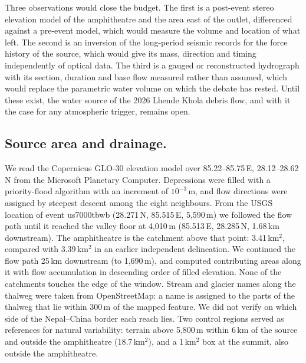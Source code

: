 \documentclass{nature}
\begin{document}
Three observations would close the budget. The first is a post-event stereo elevation model of the amphitheatre and the area east of the outlet, differenced against a pre-event model, which would measure the volume and location of what left. The second is an inversion of the long-period seismic records for the force history of the source\cite{ekstrom2013}, which would give its mass, direction and timing independently of optical data. The third is a gauged or reconstructed hydrograph with its section, duration and base flow measured rather than assumed, which would replace the parametric water volume on which the debate has rested. Until these exist, the water source of the 2026 Lhende Khola debris flow, and with it the case for any atmospheric trigger, remains open.

\begin{methods}

\subsection{Source area and drainage.}
We read the Copernicus GLO-30 elevation model\cite{copdem2021} over 85.22--85.75\textdegree\,E, 28.12--28.62\textdegree\,N from the Microsoft Planetary Computer. Depressions were filled with a priority-flood algorithm with an increment of $10^{-3}$\,m\cite{barnes2014}, and flow directions were assigned by steepest descent among the eight neighbours. From the USGS location of event us7000tbwb (28.271\textdegree\,N, 85.515\textdegree\,E, 5,590\,m) we followed the flow path until it reached the valley floor at 4,010\,m (85.513\textdegree\,E, 28.285\textdegree\,N, 1.68\,km downstream). The amphitheatre is the catchment above that point: 3.41\,km$^{2}$, compared with 3.39\,km$^{2}$ in an earlier independent delineation. We continued the flow path 25\,km downstream (to 1,690\,m), and computed contributing areas along it with flow accumulation in descending order of filled elevation. None of the catchments touches the edge of the window. Stream and glacier names along the thalweg were taken from OpenStreetMap\cite{osm2026}: a name is assigned to the parts of the thalweg that lie within 300\,m of the mapped feature. We did not verify on which side of the Nepal--China border each reach lies. Two control regions served as references for natural variability: terrain above 5,800\,m within 6\,km of the source and outside the amphitheatre (18.7\,km$^{2}$), and a 1\,km$^{2}$ box at the summit, also outside the amphitheatre.


\end{methods}
\end{document}
